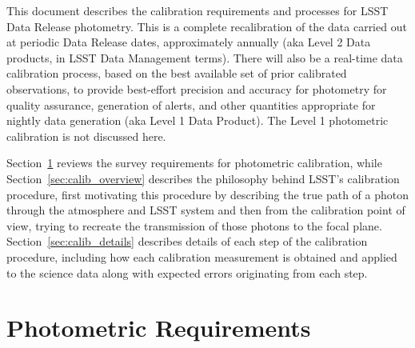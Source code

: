 \documentclass[12pt,preprint]{aastex}
\begin{document}
This document describes the calibration requirements and processes for
LSST Data Release photometry. This is a complete recalibration of the
data carried out at periodic Data Release dates, approximately
annually (aka Level 2 Data products, in LSST Data Management
terms). There will also be a real-time data calibration process, based
on the best available set of prior calibrated observations, to provide
best-effort precision and accuracy for photometry for quality
assurance, generation of alerts, and other quantities appropriate for
nightly data generation (aka Level 1 Data Product).  The Level 1
photometric calibration is not discussed here.

Section~\ref{sec:photoreq} reviews the survey requirements for
photometric calibration, while Section~\ref{sec:calib_overview}
describes the philosophy behind LSST's calibration procedure, first
motivating this procedure by describing the true path of a photon
through the atmosphere and LSST system and then from the calibration
point of view, trying to recreate the transmission of those photons to
the focal plane.  Section~\ref{sec:calib_details} describes details of
each step of the calibration procedure, including how each calibration
measurement is obtained and applied to the science data along with
expected errors originating from each step.


\section{Photometric Requirements}
\label{sec:photoreq}
\end{document}
